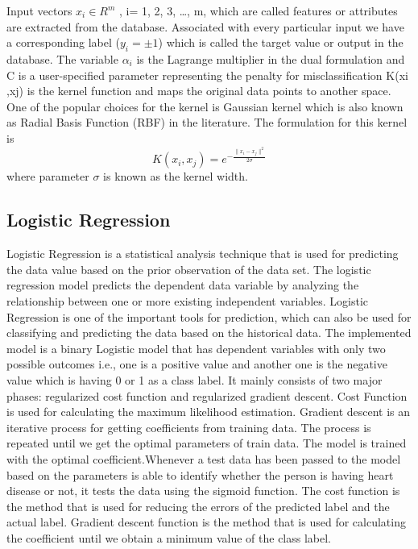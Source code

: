 \documentclass{book}
\begin{document}
    	Input vectors $x_i \in R^m$ , i= 1, 2, 3, …, m, which are called features or attributes are extracted from the database. Associated with every particular input we have a corresponding label ($ y_i = \pm 1$) which is called the target value or output in the database. The variable $\alpha_i$ is the Lagrange multiplier in the dual formulation and C is a user-specified parameter representing the penalty for misclassification K(xi ,xj) is the kernel function and maps the original data points to another space.  One of the popular choices for the kernel is Gaussian kernel which is also known as Radial Basis Function (RBF) in the literature. The formulation for this kernel is
    	\[ K(x_i, x_j) = e^{-\frac{\parallel{x_i - x_j}\parallel^2}{2\sigma}} \]
    	where parameter $\sigma$ is known as the kernel width. 
    	
    	
    	
    	\subsection{Logistic Regression}
    	Logistic Regression is a statistical analysis technique that is used for predicting the data value based on the prior observation of the data set. The logistic regression model predicts the dependent data variable by analyzing the relationship between one or more existing independent variables. Logistic Regression is one of the important tools for prediction, which can also be used for classifying and predicting the data based on the historical data. The implemented model is a binary Logistic model that has dependent variables with only two possible outcomes i.e., one is a positive value and another one is the negative value which is having 0 or 1 as a class label.
    	It mainly consists of two major phases: regularized cost function and regularized gradient descent. Cost Function is used for calculating the maximum likelihood estimation. Gradient descent is an iterative process for getting coefficients from training
    	data. The process is repeated until we get the optimal parameters of train data. The model is trained with the optimal coefficient.Whenever a test data has been passed to the model based on the parameters is able to identify whether the person is having heart disease or not, it tests the data using the sigmoid function. The cost function is the method that is used for reducing the errors of the predicted label and the actual label. Gradient descent function is the method that is used for calculating the coefficient until we obtain a minimum value of the class label.
    	
\end{document}
